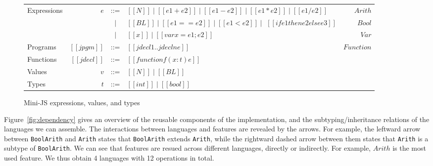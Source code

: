 \begin{figure}[t]
\centering
\begin{tabular}{lrclr}
  Expressions & $e$ & ::= & $[[N]] \mid [[e1 + e2]] \mid [[e1 - e2]] \mid [[e1 * e2]] \mid [[e1 / e2]] $ & $\mathit{Arith}$ \\
              && $\mid$ & $[[BL]] \mid [[e1 == e2]] \mid [[e1 < e2]] \mid$ $[[if e1 then e2 else e3]] $ & $\mathit{Bool}$\\
              && $\mid$ & $[[x]] \mid [[var x = e1 ; e2]]$  &  $\mathit{Var}$ \\
  Programs & $[[jpgm]]$ & ::= & $[[jdecl1 .. jdecln e]]$ & $\mathit{Function}$ \\
  Functions & $[[jdecl]]$ & ::= & $[[function f ( x : t ) { e }]]$ & \\
  Values & $v$ & ::= & $[[N]] \mid [[BL]]$ & \\
  Types  & $t$ & ::= & $[[int]] \mid [[bool]]$ &
\end{tabular}
\caption{Mini-JS expressions, values, and types}
\label{fig:mini-js}
\end{figure}



Figure~\ref{fig:dependency} gives an overview of the reusable components of the
implementation, and the subtyping/inheritance relations of the languages we can
assemble. The interactions between languages and features are revealed by the
arrows. For example, the leftward arrow between \lstinline{BoolArith} and
\lstinline{Arith} states that \lstinline{BoolArith} extends \lstinline{Arith},
while the rightward dashed arrow between them states that \lstinline{Arith} is a
subtype of \lstinline{BoolArith}. We can see that features are resued across
different languages, directly or indirectly. For example, $\mathit{Arith}$ is
the most used feature. We thus obtain 4 languages with 12 operations in total.


